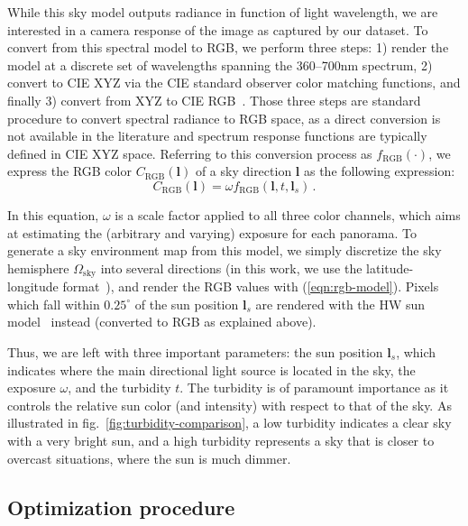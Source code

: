 While this sky model outputs radiance in function of light wavelength, we are interested in a camera response of the image as captured by our dataset. To convert from this spectral model to RGB, we perform three steps: 1) render the model at a discrete set of wavelengths spanning the 360--700nm spectrum, 2) convert to CIE XYZ via the CIE standard observer color matching functions, and finally 3) convert from XYZ to CIE RGB~\cite{hosek-siggraph-12}. Those three steps are standard procedure to convert spectral radiance to RGB space, as a direct conversion is not available in the literature and spectrum response functions are typically defined in CIE XYZ space. Referring to this conversion process as $f_\text{RGB}(\cdot)$, we express the RGB color $C_\text{RGB}(\mathbf{l})$ of a sky direction $\mathbf{l}$ as the following expression:
%
\begin{equation}
C_\text{RGB}(\mathbf{l}) = \omega f_\text{RGB}(\mathbf{l}, t, \mathbf{l}_s)\,.
\label{eqn:rgb-model} 
\end{equation}
%

In this equation, $\omega$ is a scale factor applied to all three color channels, which aims at estimating the (arbitrary and varying) exposure for each panorama. To generate a sky environment map from this model, we simply discretize the sky hemisphere $\Omega_\text{sky}$ into several directions (in this work, we use the latitude-longitude format~\cite{reinhard-book-10}), and render the RGB values with (\ref{eqn:rgb-model}). Pixels which fall within $0.25^\circ$ of the sun position $\mathbf{l}_s$ are rendered with the HW sun model~\cite{hosek-cga-13} instead (converted to RGB as explained above).

Thus, we are left with three important parameters: the sun position $\mathbf{l}_s$, which indicates where the main directional light source is located in the sky, the exposure $\omega$, and the turbidity $t$. The turbidity is of paramount importance as it controls the relative sun color (and intensity) with respect to that of the sky. As illustrated in fig.~\ref{fig:turbidity-comparison}, a low turbidity indicates a clear sky with a very bright sun, and a high turbidity represents a sky that is closer to overcast situations, where the sun is much dimmer. 

\subsection{Optimization procedure}
\label{sec:optimization}

